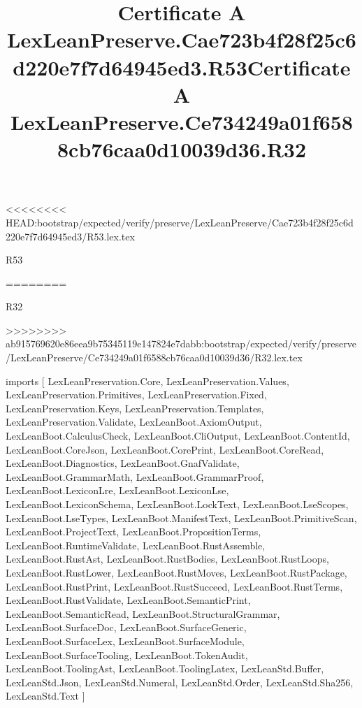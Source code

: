 <<<<<<<< HEAD:bootstrap/expected/verify/preserve/LexLeanPreserve/Cae723b4f28f25c6d220e7f7d64945ed3/R53.lex.tex
\begin{lexlean}{R53}
\title{Certificate A LexLeanPreserve.Cae723b4f28f25c6d220e7f7d64945ed3.R53}
========
\begin{lexlean}{R32}
\title{Certificate A LexLeanPreserve.Ce734249a01f6588cb76caa0d10039d36.R32}
>>>>>>>> ab915769620e86eea9b75345119e147824e7dabb:bootstrap/expected/verify/preserve/LexLeanPreserve/Ce734249a01f6588cb76caa0d10039d36/R32.lex.tex
\begin{coremodule}
imports [
  LexLeanPreservation.Core,
  LexLeanPreservation.Values,
  LexLeanPreservation.Primitives,
  LexLeanPreservation.Fixed,
  LexLeanPreservation.Keys,
  LexLeanPreservation.Templates,
  LexLeanPreservation.Validate,
  LexLeanBoot.AxiomOutput,
  LexLeanBoot.CalculusCheck,
  LexLeanBoot.CliOutput,
  LexLeanBoot.ContentId,
  LexLeanBoot.CoreJson,
  LexLeanBoot.CorePrint,
  LexLeanBoot.CoreRead,
  LexLeanBoot.Diagnostics,
  LexLeanBoot.GnafValidate,
  LexLeanBoot.GrammarMath,
  LexLeanBoot.GrammarProof,
  LexLeanBoot.LexiconLre,
  LexLeanBoot.LexiconLse,
  LexLeanBoot.LexiconSchema,
  LexLeanBoot.LockText,
  LexLeanBoot.LseScopes,
  LexLeanBoot.LseTypes,
  LexLeanBoot.ManifestText,
  LexLeanBoot.PrimitiveScan,
  LexLeanBoot.ProjectText,
  LexLeanBoot.PropositionTerms,
  LexLeanBoot.RuntimeValidate,
  LexLeanBoot.RustAssemble,
  LexLeanBoot.RustAst,
  LexLeanBoot.RustBodies,
  LexLeanBoot.RustLoops,
  LexLeanBoot.RustLower,
  LexLeanBoot.RustMoves,
  LexLeanBoot.RustPackage,
  LexLeanBoot.RustPrint,
  LexLeanBoot.RustSucceed,
  LexLeanBoot.RustTerms,
  LexLeanBoot.RustValidate,
  LexLeanBoot.SemanticPrint,
  LexLeanBoot.SemanticRead,
  LexLeanBoot.StructuralGrammar,
  LexLeanBoot.SurfaceDoc,
  LexLeanBoot.SurfaceGeneric,
  LexLeanBoot.SurfaceLex,
  LexLeanBoot.SurfaceModule,
  LexLeanBoot.SurfaceTooling,
  LexLeanBoot.TokenAudit,
  LexLeanBoot.ToolingAst,
  LexLeanBoot.ToolingLatex,
  LexLeanStd.Buffer,
  LexLeanStd.Json,
  LexLeanStd.Numeral,
  LexLeanStd.Order,
  LexLeanStd.Sha256,
  LexLeanStd.Text
]


\end{coremodule}
\end{lexlean}
\end{lexlean}
